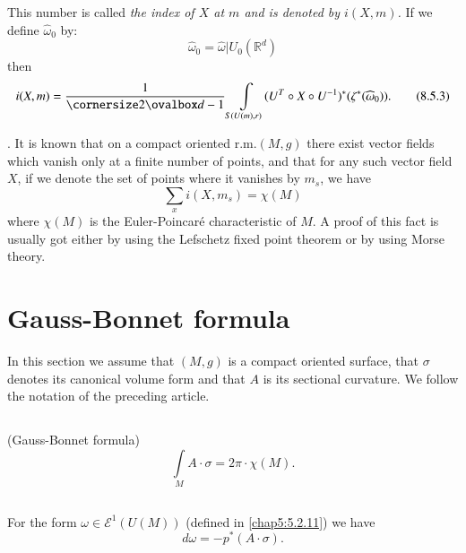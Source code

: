 This number is called {\em the index of $X$ at $m$ and is denoted by
  $i(X,m)$.} If we define $\widehat{\omega}_{0}$ by:
$$
\widehat{\omega}_{0}=\widehat{\omega}|U_{0}(\mathbb{R}^{d})
$$
then
\begin{equation*}
i(X,m)=\frac{1}{\oval{d-1}}\int\limits_{S(U(m),r)}(U^{T}\circ X\circ
U^{-1})^{\ast}(\zeta^{\ast}(\widehat{\omega}_{0})).\tag{8.5.3}\label{chap8:8.5.3} 
\end{equation*}

. It is known that on a compact oriented r.m.\@ $(M,g)$ there
  exist vector fields which vanish only at a finite number of points,
  and that for any such vector field $X$, if we denote the set of
  points where it vanishes by $m_{s}$, we have 
\begin{equation*}
\sum_{x}i(X,m_{s})=\chi(M)\tag{8.5.4}\label{chap8:8.5.4}
\end{equation*}
where $\chi(M)$ is the Euler-Poincar\'e characteristic of
$M$. A \pageoriginale proof of this fact is usually got either by using
the Lefschetz fixed point theorem or by using Morse theory.


\section{Gauss-Bonnet formula}\label{chap8:sec6}

In this section we assume that $(M,g)$ is a compact oriented surface,
that $\sigma$ denotes its canonical volume form and that $A$ is its
sectional curvature. We follow the notation of the preceding article.

\subsection{}\label{chap8:8.6.1}

\begin{theorem*}(Gauss-Bonnet formula)
$$
\int\limits_{M}A\cdot \sigma=2\pi\cdot \chi(M).
$$
\end{theorem*}


\subsection{}\label{chap8:8.6.2}

\begin{lemma*}
For the form $\omega\in \mathscr{E}^{1}(U(M))$ (defined in
\eqref{chap5:5.2.11}) we have
$$
d\omega=-p^{\ast}(A\cdot\sigma).
$$
\end{lemma*}

